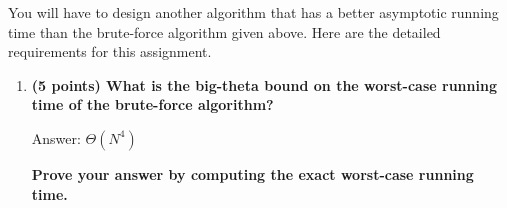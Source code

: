 \documentclass[12pt]{article}
\begin{document}
You will have to design another algorithm that has a better
asymptotic running time than the brute-force algorithm given above.
Here are the detailed requirements for this assignment.

\begin{enumerate}

  \item                            %
     {\bf \color{red} (5 points) What is the big-theta bound on the worst-case
       running time of the brute-force algorithm?}

     Answer: $\Theta(N^4)$

  {\bf \color{red} Prove your answer by computing the exact worst-case
  running time.}


\end{enumerate}
\end{document}
